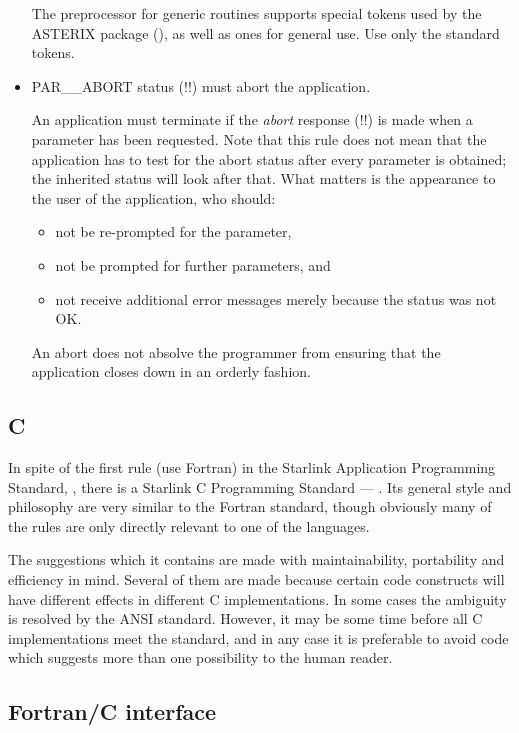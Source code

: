 \begin{itemize}
The preprocessor for generic routines supports special tokens used by the
\mbox{ASTERIX} package (), as well as ones for general
use.
Use only the standard tokens.

\item PAR\_\_ABORT status (!!) must abort the application.

An application must terminate if the {\it abort} response (!!) is made when a
parameter has been requested.
Note that this rule does not mean that the application has to test for the abort
status after every parameter is obtained;  the inherited status will look after
that. 
What matters is the appearance to the user of the application, who should:
\begin{itemize}
\item not be re-prompted for the parameter,
\item not be prompted for further parameters, and
\item not receive additional error messages merely because the status was not
 OK.
\end{itemize}
An abort does not absolve the programmer from ensuring that the application
 closes down in an orderly fashion.
\end{itemize}

\subsection{C}

In spite of the first rule (use Fortran) in the Starlink Application
Programming Standard, 
, there is a Starlink C Programming Standard ---
.
Its general style and philosophy are very similar to the Fortran standard,
though obviously many of the rules are only directly relevant to one of the
languages.  

The suggestions which it contains are made with maintainability, portability
and efficiency in mind.
Several of them are made because certain code constructs will have different
effects in different C implementations.
In some cases the ambiguity is resolved by the ANSI standard.
However, it may be some time before all C implementations meet the standard,
and in any case it is preferable to avoid code which suggests more than one
possibility to the human reader.

\subsection{Fortran/C interface}

